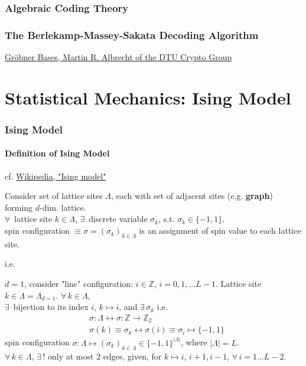\documentclass[10pt]{amsart}
\begin{document}
\begin{multicols*}{2}
\section{Algebraic Coding Theory}


\section{The Berlekamp-Massey-Sakata Decoding Algorithm}





\href{https://martinralbrecht.files.wordpress.com/2010/07/20131022_buchberger_dtu.pdf}{Gr\"{o}bner Bases, Martin R. Albrecht of the DTU Crypto Group}

\part{Statistical Mechanics: Ising Model}  

\section{Ising Model}  

\subsection{Definition of Ising Model}  

cf. \href{https://en.wikipedia.org/wiki/Ising_model}{Wikipedia, "Ising model"}

Consider set of lattice sites $\Lambda$, each with set of adjacent sites (e.g. \textbf{graph}) forming $d$-dim. lattice.  \\
$\forall \, $ lattice site $k\in \Lambda$, $\exists \, $ discrete variable $\sigma_k$, s.t. $\sigma_k \in \lbrace -1, 1\rbrace$.  \\
spin configuration $\equiv \sigma = (\sigma_k)_{k\in \Lambda}$ is an assignment of spin value to each lattice site.  

i.e. 

$d=1$, consider "line" configuration: $i \in \mathbb{Z}$, $i=0,1,\dots L-1$.  Lattice site $k \in \Lambda = \Lambda_{d=1}$.  $\forall \, k \in \Lambda$, \\ 
$\exists \, $ bijection to its index $i$, $k\mapsto i$, and $\exists \, \sigma_k$ i.e. 
\[
\begin{aligned}
	& \sigma : \Lambda \leftrightarrow \sigma: \mathbb{Z} \to \mathbb{Z}_2 \\ 
	& \sigma(k) \equiv \sigma_k \leftrightarrow \sigma(i) \equiv \sigma_i \mapsto \lbrace -1, 1 \rbrace
\end{aligned}
\]
spin configuration $\sigma : \Lambda \mapsto (\sigma_k)_{k\in \Lambda} \in \lbrace -1,1 \rbrace^{| \Lambda |}$, where $|\Lambda | =L$.  \\
$\forall \, k \in \Lambda$, $\exists \, ! $ only at most 2 edges, given, for $k\mapsto i$, $i+1,i-1$, $\forall \, i = 1 \dots L-2$.  


\end{multicols*}
\end{document}

